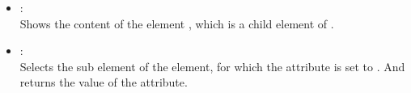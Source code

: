 \begin{itemize}

\item
{}:\\
Shows the content of the element , which is a child element of .

\item
{}:\\
Selects the  sub element of the  element, for
which the  attribute is set to . And returns the value of the
 attribute.

\end{itemize}